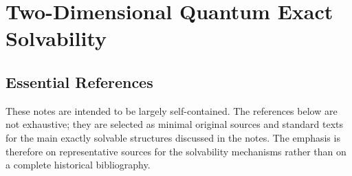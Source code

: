 \documentclass[12pt,openany]{book}
\theoremstyle{definition}
\theoremstyle{plain}
\begin{document}






\part{Two-Dimensional Quantum Exact Solvability}












\backmatter


\chapter{Essential References}
\label{chap:essential-references}

These notes are intended to be largely self-contained.  The references below are
not exhaustive; they are selected as minimal original sources and standard texts
for the main exactly solvable structures discussed in the notes.  The emphasis is
therefore on representative sources for the solvability mechanisms rather than
on a complete historical bibliography.
\end{document}
